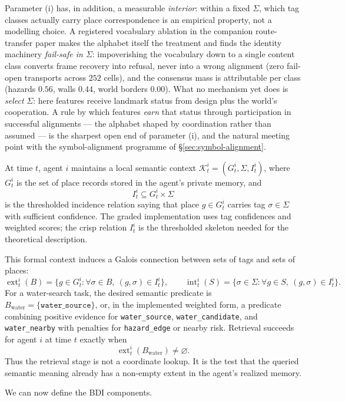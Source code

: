 \documentclass{article}
\begin{document}
Parameter (i) has, in addition, a measurable \emph{interior}: within a
fixed $\Sigma$, which tag classes actually carry place correspondence
is an empirical property, not a modelling choice. A registered
vocabulary ablation in the companion route-transfer paper makes the
alphabet itself the treatment and finds the identity machinery
\emph{fail-safe in $\Sigma$}: impoverishing the vocabulary down to a
single content class converts frame recovery into refusal, never into
a wrong alignment (zero fail-open transports across $252$ cells), and
the consensus mass is attributable per class (hazards $0.56$, walls
$0.44$, world borders $0.00$). What no mechanism yet does is
\emph{select} $\Sigma$: here features receive landmark status from
design plus the world's cooperation. A rule by which features
\emph{earn} that status through participation in successful alignments
--- the alphabet shaped by coordination rather than assumed --- is the
sharpest open end of parameter (i), and the natural meeting point with
the symbol-alignment programme of \S\ref{sec:symbol-alignment}.

At time $t$, agent $i$ maintains a local semantic context
$\mathcal{K}_t^i=(G_t^i,\Sigma,I_t^i)$, where $G_t^i$ is the set of
place records stored in the agent's private memory, and
\[
I_t^i \subseteq G_t^i \times \Sigma
\]
is the thresholded incidence relation saying that place $g\in G_t^i$
carries tag $\sigma\in\Sigma$ with sufficient confidence. The graded
implementation uses tag confidences and weighted scores; the crisp
relation $I_t^i$ is the thresholded skeleton needed for the theoretical
description.

This formal context induces a Galois connection between sets of tags
and sets of places:
\[
\operatorname{ext}_t^i(B)=\{g\in G_t^i:\forall\sigma\in B,\ (g,\sigma)\in I_t^i\},
\qquad
\operatorname{int}_t^i(S)=\{\sigma\in\Sigma:\forall g\in S,\ (g,\sigma)\in I_t^i\}.
\]
For a water-search task, the desired semantic predicate is
$B_{\mathrm{water}}=\{\texttt{water\_source}\}$, or, in the implemented
weighted form, a predicate combining positive evidence for
\texttt{water\_source}, \texttt{water\_candidate}, and
\texttt{water\_nearby} with penalties for \texttt{hazard\_edge} or
nearby risk. Retrieval succeeds for agent $i$ at time $t$ exactly when
\[
\operatorname{ext}_t^i(B_{\mathrm{water}})\neq\varnothing .
\]
Thus the retrieval stage is not a coordinate lookup. It is the test
that the queried semantic meaning already has a non-empty extent in the
agent's realized memory.

We can now define the BDI components.
\end{document}
